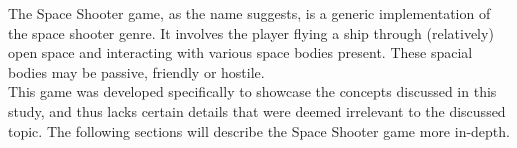 The Space Shooter game, as the name suggests, is a generic implementation of the space shooter genre. It involves the player flying a ship through (relatively) open space and interacting with various space bodies present. These spacial bodies may be passive, friendly or hostile. \\ 
This game was developed specifically to showcase the concepts discussed in this study, and thus lacks certain details that were deemed irrelevant to the discussed topic. The following sections will describe the Space Shooter game  more in-depth.